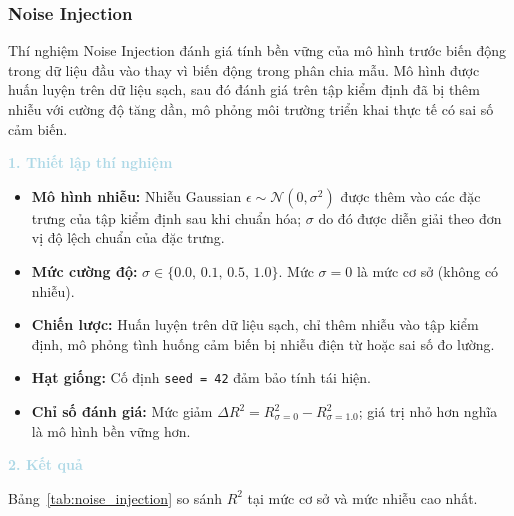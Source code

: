 \subsubsection{Noise Injection}

Thí nghiệm Noise Injection đánh giá tính bền vững của mô hình trước biến động trong dữ liệu đầu vào
thay vì biến động trong phân chia mẫu.
Mô hình được huấn luyện trên dữ liệu sạch, sau đó đánh giá trên tập kiểm định đã bị thêm nhiễu
với cường độ tăng dần, mô phỏng môi trường triển khai thực tế có sai số cảm biến.

\vspace{0.5em}
\noindent\textcolor{lightblue}{\textbf{1. Thiết lập thí nghiệm}}
\vspace{0.5em}

\begin{itemize}
    \item \textbf{Mô hình nhiễu:} Nhiễu Gaussian $\epsilon \sim \mathcal{N}(0, \sigma^2)$ được thêm vào các đặc trưng của tập kiểm định sau khi chuẩn hóa; $\sigma$ do đó được diễn giải theo đơn vị độ lệch chuẩn của đặc trưng.
    \item \textbf{Mức cường độ:} $\sigma \in \{0.0,\, 0.1,\, 0.5,\, 1.0\}$. Mức $\sigma = 0$ là mức cơ sở (không có nhiễu).
    \item \textbf{Chiến lược:} Huấn luyện trên dữ liệu sạch, chỉ thêm nhiễu vào tập kiểm định, mô phỏng tình huống cảm biến bị nhiễu điện từ hoặc sai số đo lường.
    \item \textbf{Hạt giống:} Cố định \texttt{seed = 42} đảm bảo tính tái hiện.
    \item \textbf{Chỉ số đánh giá:} Mức giảm $\Delta R^2 = R^2_{\sigma=0} - R^2_{\sigma=1.0}$; giá trị nhỏ hơn nghĩa là mô hình bền vững hơn.
\end{itemize}

\vspace{0.5em}
\noindent\textcolor{lightblue}{\textbf{2. Kết quả}}
\vspace{0.5em}

Bảng~\ref{tab:noise_injection} so sánh $R^2$ tại mức cơ sở và mức nhiễu cao nhất.

